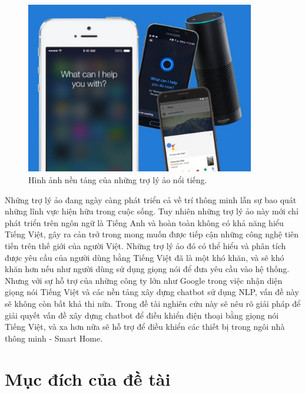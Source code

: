 \documentclass[12pt]{report}
\begin{document}
\begin{figure}[H]
  \centering
    \includegraphics[width=10cm]{Pics/Chap1/virtual-assistants.png}
  \caption{Hình ảnh nền tảng của những trợ lý ảo nổi tiếng\cite{va-compare}.}
\end{figure}

Những trợ lý ảo đang ngày càng phát triển cả về trí thông minh lẫn sự bao quát những lĩnh vực hiện hữu trong cuộc sống. Tuy nhiên những trợ lý ảo này mới chỉ phát triển trên ngôn ngữ là Tiếng Anh và hoàn toàn không có khả năng hiểu Tiếng Việt, gây ra cản trở trong mong muốn được tiếp cận những công nghệ tiên tiến trên thế giới của người Việt. Những trợ lý ảo đó có thể hiểu và phân tích được yêu cầu của người dùng bằng Tiếng Việt đã là một khó khăn, và sẽ khó khăn hơn nếu như người dùng sử dụng giọng nói để đưa yêu cầu vào hệ thống. Nhưng với sự hỗ trợ của những công ty lớn như Google trong việc nhận diện giọng nói Tiếng Việt và các nền tảng xây dựng chatbot sử dụng NLP, vấn đề này sẽ không còn bất khả thi nữa. Trong đề tài nghiên cứu này sẽ nêu rõ giải pháp để giải quyết vấn đề xây dựng chatbot để điều khiển điện thoại bằng giọng nói Tiếng Việt, và xa hơn nữa sẽ hỗ trợ để điều khiển các thiết bị trong ngôi nhà thông minh - Smart Home.

\section{Mục đích của đề tài}
\end{document}
